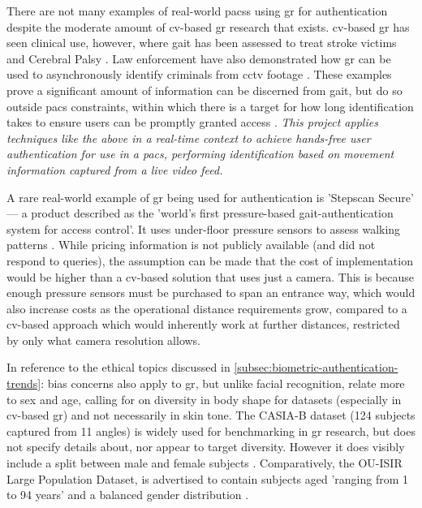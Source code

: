 There are not many examples of real-world \ac{pacs}s using \ac{gr} for authentication despite the moderate amount of \ac{cv}-based \ac{gr} research that exists.
\ac{cv}-based \ac{gr} has seen clinical use, however, where gait has been assessed to treat stroke victims and Cerebral Palsy \parencite{davisReflectionsClinicalGait1997}.
Law enforcement have also demonstrated how \ac{gr} can be used to asynchronously identify criminals from \ac{cctv} footage \parencite{nebulampKannurPoliceFollow2024}.
These examples prove a significant amount of information can be discerned from gait, but do so outside \ac{pacs} constraints, within which there is a target for how long identification takes to ensure users can be promptly granted access \parencite{sandhuAccessControlPrinciple1994}.
\textit{This project applies techniques like the above in a real-time context to achieve hands-free user authentication for use in a \ac{pacs}, performing identification based on movement information captured from a live video feed.}

A rare real-world example of \ac{gr} being used for authentication is 'Stepscan Secure' --- a product described as the 'world's first pressure-based gait-authentication system for access control'.
It uses under-floor pressure sensors to assess walking patterns \parencite{stepscanGaitAuthenticationSecurity2020}.
While pricing information is not publicly available (and \citeauthor{stepscanGaitAuthenticationSecurity2020} did not respond to queries), the assumption can be made that the cost of implementation would be higher than a \ac{cv}-based solution that uses just a camera.
This is because enough pressure sensors must be purchased to span an entrance way, which would also increase costs as the operational distance requirements grow, compared to a \ac{cv}-based approach which would inherently work at further distances, restricted by only what camera resolution allows.

In reference to the ethical topics discussed in \ref{subsec:biometric-authentication-trends}:
bias concerns also apply to \ac{gr}, but unlike facial recognition, relate more to sex and age, calling for on diversity in body shape for datasets (especially in \ac{cv}-based \ac{gr}) and not necessarily in skin tone.
The CASIA-B dataset (124 subjects captured from 11 angles) is widely used for benchmarking in \ac{gr} research, but does not specify details about, nor appear to target diversity. However it does visibly include a split between male and female subjects \parencite{fuCASIABPoseCASIABPose2023}.
Comparatively, the OU-ISIR Large Population Dataset, is advertised to contain subjects aged 'ranging from 1 to 94 years' and a balanced gender distribution \parencite{iwamaOUISIRGaitDatabase2012}.


